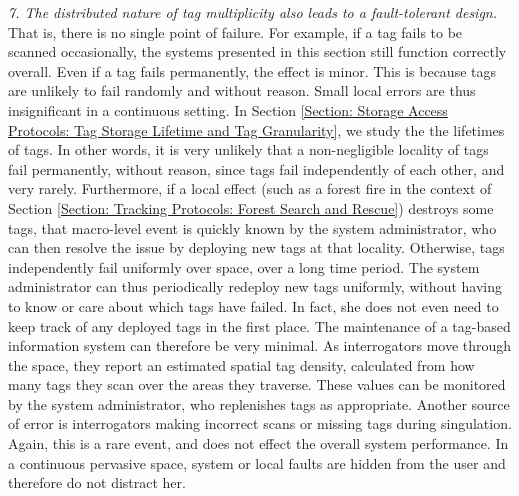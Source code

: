 \emph{7. The distributed nature of tag multiplicity also leads to a fault-tolerant design.} That is, there is no single point of failure. For example, if a tag fails to be scanned occasionally, the systems presented in this section still function correctly overall. Even if a tag fails permanently, the effect is minor. This is because tags are unlikely to fail randomly and without reason. Small local errors are thus insignificant in a continuous setting. In Section \ref{Section: Storage Access Protocols: Tag Storage Lifetime and Tag Granularity}, we study the the lifetimes of tags. In other words, it is very unlikely that a non-negligible locality of tags fail permanently, without reason, since tags fail independently of each other, and very rarely. Furthermore, if a local effect (such as a forest fire in the context of Section \ref{Section: Tracking Protocols: Forest Search and Rescue}) destroys some tags, that macro-level event is quickly known by the system administrator, who can then resolve the issue by deploying new tags at that locality. Otherwise, tags independently fail uniformly over space, over a long time period. The system administrator can thus periodically redeploy new tags uniformly, without having to know or care about which tags have failed. In fact, she does not even need to keep track of any deployed tags in the first place. The maintenance of a tag-based information system can therefore be very minimal. As interrogators move through the space, they report an estimated spatial tag density, calculated from how many tags they scan over the areas they traverse. These values can be monitored by the system administrator, who replenishes tags as appropriate. Another source of error is interrogators making incorrect scans or missing tags during singulation. Again, this is a rare event, and does not effect the overall system performance. In a continuous pervasive space, system or local faults are hidden from the user and therefore do not distract her.

